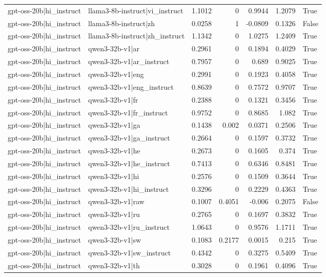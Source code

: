 \begin{table}
\begin{tabular}{l l r r r r l}
gpt-oss-20b|hi_instruct & llama3-8b-instruct|vi_instruct & 1.1012 & 0 & 0.9944 & 1.2079 & True \\
gpt-oss-20b|hi_instruct & llama3-8b-instruct|zh & 0.0258 & 1 & -0.0809 & 0.1326 & False \\
gpt-oss-20b|hi_instruct & llama3-8b-instruct|zh_instruct & 1.1342 & 0 & 1.0275 & 1.2409 & True \\
gpt-oss-20b|hi_instruct & qwen3-32b-v1|ar & 0.2961 & 0 & 0.1894 & 0.4029 & True \\
gpt-oss-20b|hi_instruct & qwen3-32b-v1|ar_instruct & 0.7957 & 0 & 0.689 & 0.9025 & True \\
gpt-oss-20b|hi_instruct & qwen3-32b-v1|eng & 0.2991 & 0 & 0.1923 & 0.4058 & True \\
gpt-oss-20b|hi_instruct & qwen3-32b-v1|eng_instruct & 0.8639 & 0 & 0.7572 & 0.9707 & True \\
gpt-oss-20b|hi_instruct & qwen3-32b-v1|fr & 0.2388 & 0 & 0.1321 & 0.3456 & True \\
gpt-oss-20b|hi_instruct & qwen3-32b-v1|fr_instruct & 0.9752 & 0 & 0.8685 & 1.082 & True \\
gpt-oss-20b|hi_instruct & qwen3-32b-v1|ga & 0.1438 & 0.002 & 0.0371 & 0.2506 & True \\
gpt-oss-20b|hi_instruct & qwen3-32b-v1|ga_instruct & 0.2664 & 0 & 0.1597 & 0.3732 & True \\
gpt-oss-20b|hi_instruct & qwen3-32b-v1|he & 0.2673 & 0 & 0.1605 & 0.374 & True \\
gpt-oss-20b|hi_instruct & qwen3-32b-v1|he_instruct & 0.7413 & 0 & 0.6346 & 0.8481 & True \\
gpt-oss-20b|hi_instruct & qwen3-32b-v1|hi & 0.2576 & 0 & 0.1509 & 0.3644 & True \\
gpt-oss-20b|hi_instruct & qwen3-32b-v1|hi_instruct & 0.3296 & 0 & 0.2229 & 0.4363 & True \\
gpt-oss-20b|hi_instruct & qwen3-32b-v1|raw & 0.1007 & 0.4051 & -0.006 & 0.2075 & False \\
gpt-oss-20b|hi_instruct & qwen3-32b-v1|ru & 0.2765 & 0 & 0.1697 & 0.3832 & True \\
gpt-oss-20b|hi_instruct & qwen3-32b-v1|ru_instruct & 1.0643 & 0 & 0.9576 & 1.1711 & True \\
gpt-oss-20b|hi_instruct & qwen3-32b-v1|sw & 0.1083 & 0.2177 & 0.0015 & 0.215 & True \\
gpt-oss-20b|hi_instruct & qwen3-32b-v1|sw_instruct & 0.4342 & 0 & 0.3275 & 0.5409 & True \\
gpt-oss-20b|hi_instruct & qwen3-32b-v1|th & 0.3028 & 0 & 0.1961 & 0.4096 & True \\

\end{tabular}
\end{table}

